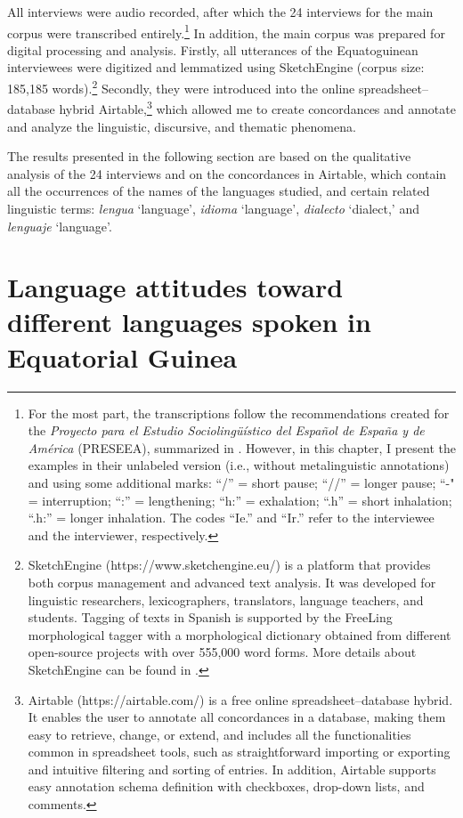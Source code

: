 \documentclass[output=paper]{langscibook}
\begin{document}
All interviews were audio recorded, after which the 24 interviews for the main corpus were transcribed entirely.\footnote{For the most part, the transcriptions follow the recommendations created for the \textit{Proyecto para el Estudio Sociolingüístico del Español de España y de América} (PRESEEA), summarized in \citet{moreno_fernandez_marcas_2021}. However, in this chapter, I present the examples in their unlabeled version (i.e., without metalinguistic annotations) and using some additional marks: “/” = short pause; “//” = longer pause; “-" = interruption; “:” = lengthening; “h:” = exhalation; “.h” = short inhalation; “.h:” = longer inhalation. The codes “Ie.” and “Ir.” refer to the interviewee and the interviewer, respectively.}  In addition, the main corpus was prepared for digital processing and analysis. Firstly, all utterances of the Equatoguinean interviewees were digitized and lemmatized using SketchEngine (corpus size: 185,185 words).\footnote{SketchEngine (https://www.sketchengine.eu/) is a platform that provides both corpus management and advanced text analysis. It was developed for linguistic researchers, lexicographers, translators, language teachers, and students. Tagging of texts in Spanish is supported by the FreeLing morphological tagger with a morphological dictionary obtained from different open-source projects with over 555,000 word forms. More details about SketchEngine can be found in \citet{kilgarriff_sketch_2014}.}  Secondly, they were introduced into the online spreadsheet–database hybrid Airtable,\footnote{Airtable (https://airtable.com/) is a free online spreadsheet–database hybrid. It enables the user to annotate all concordances in a database, making them easy to retrieve, change, or extend, and includes all the functionalities common in spreadsheet tools, such as straightforward importing or exporting and intuitive filtering and sorting of entries. In addition, Airtable supports easy annotation schema definition with checkboxes, drop-down lists, and comments.} which allowed me to create concordances and annotate and analyze the linguistic, discursive, and thematic phenomena.

The results presented in the following section are based on the qualitative analysis of the 24 interviews and on the concordances in Airtable, which contain all the occurrences of the names of the languages studied, and certain related linguistic terms: \textit{lengua} ‘language’, \textit{idioma} ‘language’, \textit{dialecto} ‘dialect,’ and \textit{lenguaje} ‘language’.

\section{Language attitudes toward different languages spoken in Equatorial Guinea}\label{schlumpf:sec:language}
\end{document}
